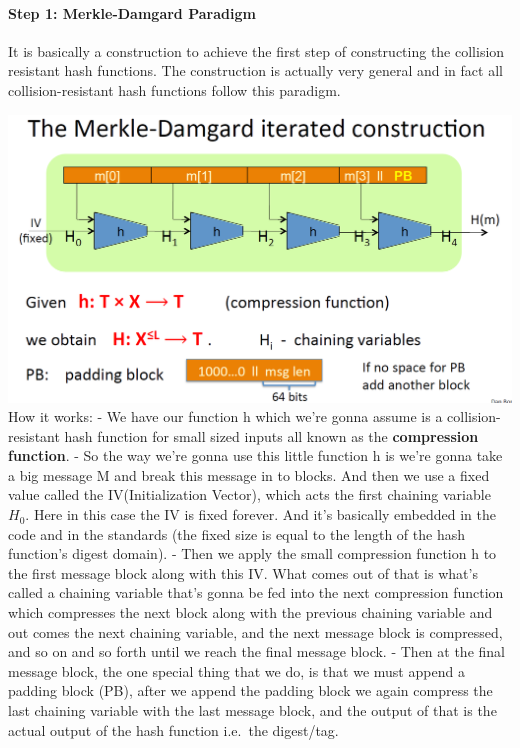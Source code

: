 \documentclass[11pt]{article}
\makeatletter
\def\maxwidth{\ifdim\Gin@nat@width>\linewidth\linewidth
    \else\Gin@nat@width\fi}
\let\Oldincludegraphics\includegraphics
\renewcommand{\includegraphics}[1]{\Oldincludegraphics[width=.8\maxwidth]{#1}}
\makeatother
\begin{document}
\hypertarget{step-1-merkle-damgard-paradigm}{%
\paragraph{Step 1: Merkle-Damgard
Paradigm}\label{step-1-merkle-damgard-paradigm}}

It is basically a construction to achieve the first step of constructing
the collision resistant hash functions. The construction is actually
very general and in fact all collision-resistant hash functions follow
this paradigm.

\includegraphics{./Images/Merkle-DamgardParadigm.png} How it works: - We
have our function h which we're gonna assume is a collision-resistant
hash function for small sized inputs all known as the
\textbf{compression function}. - So the way we're gonna use this little
function h is we're gonna take a big message M and break this message in
to blocks. And then we use a fixed value called the IV(Initialization
Vector), which acts the first chaining variable \(H_{0}\). Here in this
case the IV is fixed forever. And it's basically embedded in the code
and in the standards (the fixed size is equal to the length of the hash
function's digest domain). - Then we apply the small compression
function h to the first message block along with this IV. What comes out
of that is what's called a chaining variable that's gonna be fed into
the next compression function which compresses the next block along with
the previous chaining variable and out comes the next chaining variable,
and the next message block is compressed, and so on and so forth until
we reach the final message block. - Then at the final message block, the
one special thing that we do, is that we must append a padding block
(PB), after we append the padding block we again compress the last
chaining variable with the last message block, and the output of that is
the actual output of the hash function i.e.~the digest/tag.
\end{document}
